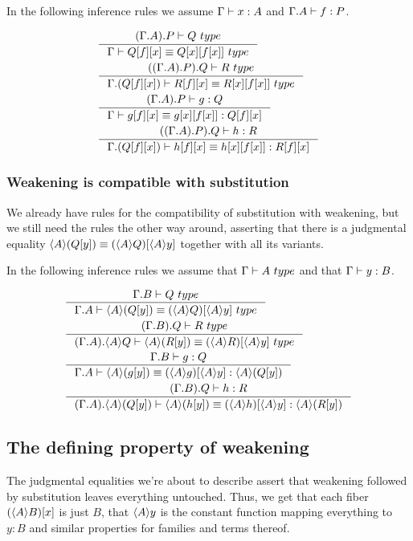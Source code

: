 In the following inference rules we assume
$\jterm{\Gamma}{A}{x}$ and $\jterm{\ctxext{\Gamma}{A}}{P}{f}$.

\begin{align}
&\inference{\jtype{\ctxext{{\Gamma}{A}}{P}}{Q}}
{\jtypeeq{\Gamma}{\subst{x}{{f}{Q}}}{\subst{{x}{f}}{{x}{Q}}}}\\
&\inference{\jtype{\ctxext{{{\Gamma}{A}}{P}}{Q}}{R}}
{\jtypeeq{\ctxext{\Gamma}{\subst{x}{{f}{Q}}}}{\subst{x}{{f}{R}}}{\subst{{x}{f}}{{x}{R}}}}\\
&\inference{\jterm{\ctxext{{\Gamma}{A}}{P}}{Q}{g}}
{\jtermeq{\Gamma}{\subst{x}{{f}{Q}}}{\subst{x}{{f}{g}}}{\subst{{x}{f}}{{x}{g}}}}\\
&\inference{\jterm{\ctxext{{{\Gamma}{A}}{P}}{Q}}{R}{h}}
{\jtermeq{\ctxext{\Gamma}{\subst{x}{{f}{Q}}}}{\subst{x}{{f}{R}}}{\subst{x}{{f}{h}}}{\subst{{x}{f}}{{x}{h}}}}
\end{align}

\subsubsection{Weakening is compatible with substitution}
We already have rules for the compatibility of substitution with weakening, but
we still need the rules the other way around, asserting that there is a 
judgmental equality $\ctxwk{A}{\subst{y}{Q}}\jdeq\subst{\ctxwk{A}{y}}{\ctxwk{A}{Q}}$
together with all its variants.

In the following inference rules we assume that $\jtype{\Gamma}{A}$ and that
$\jterm{\Gamma}{B}{y}$.

\begin{align}
& \inference{\jtype{\ctxext{\Gamma}{B}}{Q}}{\jtypeeq{\ctxext{\Gamma}{A}}{\ctxwk{A}{\subst{y}{Q}}}{\subst{\ctxwk{A}{y}}{\ctxwk{A}{Q}}}}\\
& \inference{\jtype{\ctxext{{\Gamma}{B}}{Q}}{R}}{\jtypeeq{\ctxext{{\Gamma}{A}}{\ctxwk{A}{Q}}}{\ctxwk{A}{\subst{y}{R}}}{\subst{\ctxwk{A}{y}}{\ctxwk{A}{R}}}}\\
& \inference{\jterm{\ctxext{\Gamma}{B}}{Q}{g}}{\jtermeq{\ctxext{\Gamma}{A}}{\ctxwk{A}{\subst{y}{Q}}}{\ctxwk{A}{\subst{y}{g}}}{\subst{\ctxwk{A}{y}}{\ctxwk{A}{g}}}}\\
& \inference{\jterm{\ctxext{{\Gamma}{B}}{Q}}{R}{h}}{\jtermeq{\ctxext{{\Gamma}{A}}{\ctxwk{A}{\subst{y}{Q}}}}{\ctxwk{A}{\subst{y}{R}}}{\ctxwk{A}{\subst{y}{h}}}{\subst{\ctxwk{A}{y}}{\ctxwk{A}{h}}}}
\end{align}

\subsection{The defining property of weakening}
The judgmental equalities we're about to describe assert that weakening followed
by substitution leaves everything untouched. Thus, we get that each fiber
$\subst{x}{\ctxwk{A}{B}}$ is just $B$, that $\ctxwk{A}{y}$ is the constant function
mapping everything to $y:B$ and similar properties for families and terms thereof.

